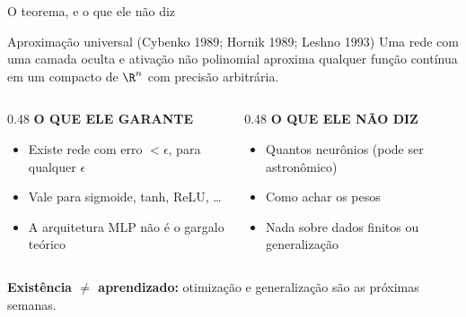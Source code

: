 \documentclass[aspectratio=169, 11pt]{beamer}
\begin{document}
\begin{frame}{O teorema, e o que ele não diz}

  \begin{teobox}{Aproximação universal (Cybenko 1989; Hornik 1989; Leshno 1993)}
    Uma rede com uma camada oculta e ativação não polinomial aproxima qualquer
    função contínua em um compacto de $\R^n$ com precisão arbitrária.
  \end{teobox}

  \smallskip
  \begin{columns}[T]
    \begin{column}{0.48\textwidth}
      {\color{icVerde}\bfseries\small O QUE ELE GARANTE}
      \begin{itemize}\setlength{\itemsep}{0.2ex}
        \item Existe rede com erro $< \epsilon$, para qualquer $\epsilon$
        \item Vale para sigmoide, tanh, ReLU, \dots
        \item A arquitetura MLP não é o gargalo teórico
      \end{itemize}
    \end{column}
    \begin{column}{0.48\textwidth}
      {\color{icCarmim}\bfseries\small O QUE ELE NÃO DIZ}
      \begin{itemize}\setlength{\itemsep}{0.2ex}
        \item Quantos neurônios (pode ser astronômico)
        \item Como achar os pesos
        \item Nada sobre dados finitos ou generalização
      \end{itemize}
    \end{column}
  \end{columns}

  \smallskip
  \begin{center}
    {\color{icCarmim}\small\bfseries Existência $\ne$ aprendizado:}
    {\small\color{icCinza} otimização e generalização são as próximas semanas.}
  \end{center}
\end{frame}
\end{document}
